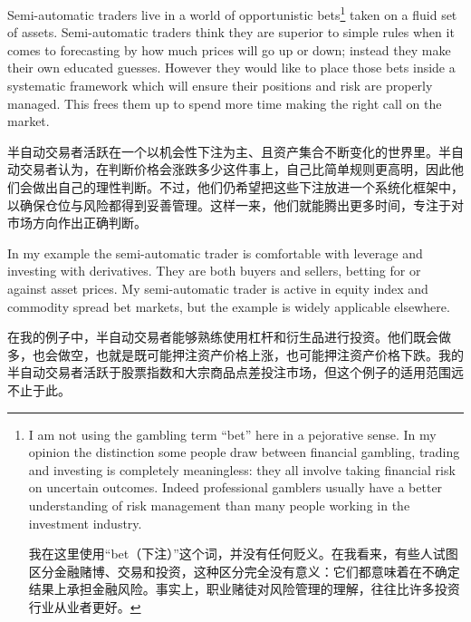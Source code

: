 
\begin{englishblock} Semi-automatic traders live in a world of opportunistic bets\footnote{I am not using the gambling term ``bet'' here in a pejorative sense. In my opinion the distinction some people draw between financial gambling, trading and investing is completely meaningless: they all involve taking financial risk on uncertain outcomes. Indeed professional gamblers usually have a better understanding of risk management than many people working in the investment industry. \par 我在这里使用“bet（下注）”这个词，并没有任何贬义。在我看来，有些人试图区分金融赌博、交易和投资，这种区分完全没有意义：它们都意味着在不确定结果上承担金融风险。事实上，职业赌徒对风险管理的理解，往往比许多投资行业从业者更好。} taken on a fluid set of assets. Semi-automatic traders think they are superior to simple rules when it comes to forecasting by how much prices will go up or down; instead they make their own educated guesses. However they would like to place those bets inside a systematic framework which will ensure their positions and risk are properly managed. This frees them up to spend more time making the right call on the market. \end{englishblock}

\begin{chineseblock}半自动交易者活跃在一个以机会性下注为主、且资产集合不断变化的世界里。半自动交易者认为，在判断价格会涨跌多少这件事上，自己比简单规则更高明，因此他们会做出自己的理性判断。不过，他们仍希望把这些下注放进一个系统化框架中，以确保仓位与风险都得到妥善管理。这样一来，他们就能腾出更多时间，专注于对市场方向作出正确判断。\end{chineseblock}

\bipairgap

\begin{englishblock} In my example the semi-automatic trader is comfortable with leverage and investing with derivatives. They are both buyers and sellers, betting for or against asset prices. My semi-automatic trader is active in equity index and commodity spread bet markets, but the example is widely applicable elsewhere. \end{englishblock}

\begin{chineseblock}在我的例子中，半自动交易者能够熟练使用杠杆和衍生品进行投资。他们既会做多，也会做空，也就是既可能押注资产价格上涨，也可能押注资产价格下跌。我的半自动交易者活跃于股票指数和大宗商品点差投注市场，但这个例子的适用范围远不止于此。\end{chineseblock}

